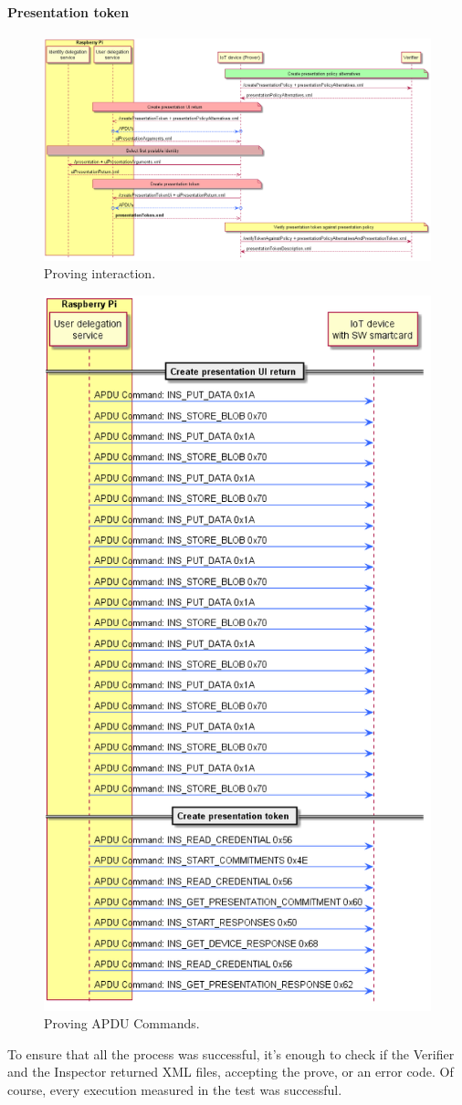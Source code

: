 \paragraph{Presentation token}



\begin{figure}[bth]
	\begin{center}
		\includegraphics[width=\linewidth]{gfx/ProvingInteraction}
	\end{center}
	\caption{Proving interaction.}
	\label{fig:ProvingInteraction}
\end{figure}

\begin{figure}[bth]
	\begin{center}
		\includegraphics[width=0.7\linewidth]{gfx/APDUsProving}
	\end{center}
	\caption{Proving APDU Commands.}
	\label{fig:APDUsProving}
\end{figure}

To ensure that all the process was successful, it's enough to check if the Verifier and the Inspector returned XML files, accepting the prove, or an error code. Of course, every execution measured in the test was successful.